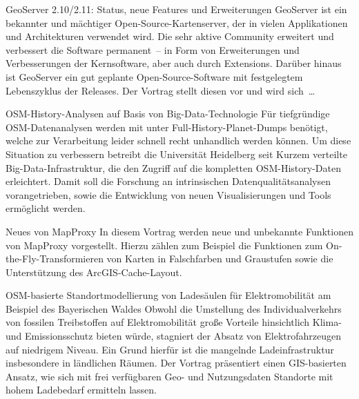 %
{GeoServer 2.10/2.11: Status, neue Features und Erweiterungen}%
{}%
{GeoServer ist ein bekannter und mächtiger Open-Source-Kartenserver, der in
vielen Applikationen und Architek\-turen verwendet wird.
Die sehr aktive Community erweitert und verbessert die Software
permanent~-- in Form von Erweiterungen und Verbesserungen der Kernsoftware, aber
auch durch Extensions.
Darüber hinaus ist GeoServer ein gut geplante Open-Source-Software mit
festgelegtem Lebenszyklus der Releases. Der Vortrag
stellt diesen vor und wird
sich~\dots %
}


%
{OSM-History-Analysen auf Basis von Big-Data-Technologie}%
{}%
{Für tiefgründige OSM-Datenanalysen werden mit unter Full-History-Planet-Dumps benötigt, welche zur
Verarbeitung leider schnell recht unhandlich werden können. Um diese Situation zu verbessern
betreibt die Universität Heidelberg seit Kurzem verteilte Big-Data-Infrastruktur, die den Zugriff
auf die kompletten OSM-History-Daten erleichtert. Damit soll die Forschung an intrinsischen
Datenqualitätsanalysen vorangetrieben, sowie die Entwicklung von neuen Visualisierungen und Tools
ermöglicht werden.}%

%
{Neues von MapProxy}%
{}%
{In diesem Vortrag werden neue und unbekannte Funktionen von MapProxy vorgestellt. Hierzu zählen zum
Beispiel die Funktionen zum On-the-Fly-Transformieren von Karten in Falschfarben und Graustufen
sowie die Unterstützung des ArcGIS-Cache-Layout.}

%
{OSM-basierte Standortmodellierung von Ladesäulen für Elektromobilität am Beispiel des Bayerischen Waldes}%
{}%
{Obwohl die Umstellung des Individualverkehrs von fossilen Treibstoffen auf Elektromobilität große
Vorteile hinsichtlich Klima- und Emissionsschutz bieten würde, stagniert der Absatz von
Elektrofahrzeugen auf niedrigem Niveau. Ein Grund hierfür ist die mangelnde Ladeinfrastruktur
insbesondere in ländlichen Räumen. Der Vortrag präsentiert einen GIS-basierten Ansatz, wie sich mit
frei verfügbaren Geo- und Nutzungsdaten Standorte mit hohem Ladebedarf ermitteln lassen.}

\vspace{-0.4\baselineskip}
\enlargethispage{0.4\baselineskip}

